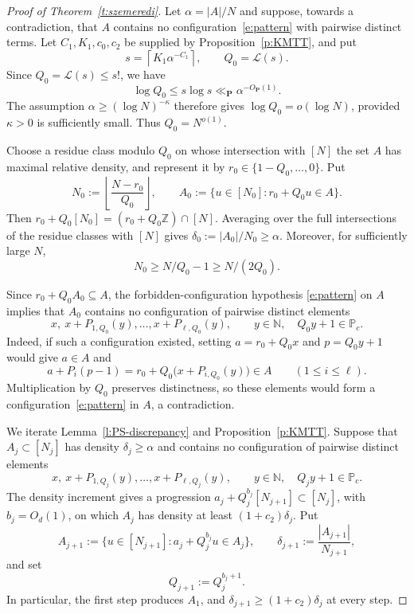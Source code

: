 \documentclass[12pt]{amsart}
\newcommand{\N}{\mathbb N}
\newcommand{\Z}{\mathbb Z}
\newcommand{\1}{\mathbf 1}
\begin{document}
\begin{proof}[Proof of Theorem~\ref{t:szemeredi}]
Let $\alpha=|A|/N$ and suppose, towards a contradiction, that $A$ contains
no configuration~\eqref{e:pattern} with pairwise distinct terms.  Let
$C_1,K_1,c_0,c_2$ be supplied by Proposition~\ref{p:KMTT}, and put
\[
 s=\left\lceil K_1\alpha^{-C_1}\right\rceil,
 \qquad Q_0=\mathcal L(s).
\]
Since $Q_0=\mathcal L(s)\leq s!$, we have
\[
 \log Q_0\leq s\log s
 \ll_{\mathbf P}\alpha^{-O_{\mathbf P}(1)}.
\]
The assumption $\alpha\geq(\log N)^{-\kappa}$ therefore gives
$\log Q_0=o(\log N)$, provided $\kappa>0$ is sufficiently small.
Thus $Q_0=N^{o(1)}$.

Choose a residue class modulo $Q_0$ on whose intersection with
$[N]$ the set $A$ has maximal relative density, and represent
it by $r_0\in\{1-Q_0,\ldots,0\}$. Put
\[
 N_0:=\left\lfloor\frac{N-r_0}{Q_0}\right\rfloor,\qquad
 A_0:=\{u\in[N_0]:r_0+Q_0u\in A\}.
\]
Then $r_0+Q_0[N_0]=(r_0+Q_0\Z)\cap[N]$.
Averaging over the full intersections of the residue classes
with $[N]$ gives $\delta_0:=|A_0|/N_0\geq\alpha$.
Moreover, for sufficiently large $N$,
\begin{equation}\label{e:initial-scale}
 N_0\geq N/Q_0-1\geq N/(2Q_0).
\end{equation}

Since $r_0+Q_0A_0\subseteq A$, the forbidden-configuration
hypothesis \eqref{e:pattern} on $A$ implies that $A_0$ contains no configuration
of pairwise distinct elements
\[
 x,\ x+P_{1,Q_0}(y),\ldots,x+P_{\ell,Q_0}(y),
 \qquad y\in\N,\quad Q_0y+1\in\mathbb P_c.
\]
Indeed, if such a configuration existed, setting
$a=r_0+Q_0x$ and $p=Q_0y+1$ would give $a\in A$ and
\[
 a+P_i(p-1)
 =r_0+Q_0\bigl(x+P_{i,Q_0}(y)\bigr)\in A
 \qquad(1\leq i\leq\ell).
\]
Multiplication by $Q_0$ preserves distinctness, so these elements
would form a configuration~\eqref{e:pattern} in $A$, a contradiction.


We iterate Lemma~\ref{l:PS-discrepancy} and
Proposition~\ref{p:KMTT}. Suppose that $A_j\subset[N_j]$ has density
$\delta_j\geq\alpha$ and contains no configuration of pairwise
distinct elements
\[
 x,\ x+P_{1,Q_j}(y),\ldots,x+P_{\ell,Q_j}(y),
 \qquad y\in\N,\quad Q_jy+1\in\mathbb P_c.
\]
The density increment gives a progression
$a_j+Q_j^{b_j}[N_{j+1}]\subset[N_j]$, with $b_j=O_d(1)$, on which
$A_j$ has density at least $(1+c_2)\delta_j$. Put
\[
 A_{j+1}:=\{u\in[N_{j+1}]:a_j+Q_j^{b_j}u\in A_j\},
 \qquad
 \delta_{j+1}:=\frac{|A_{j+1}|}{N_{j+1}},
\]
and set
\begin{equation}\label{e:next-modulus}
 Q_{j+1}:=Q_j^{b_j+1}.
\end{equation}
In particular, the first step produces $A_1$, and
$\delta_{j+1}\geq(1+c_2)\delta_j$ at every step.


\end{proof}
\end{document}
